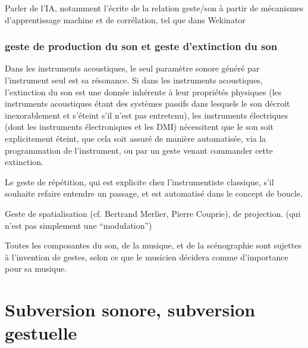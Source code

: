 
Parler de l'IA, notamment l'écrite de la relation geste/son à partir de mécanismes d'apprentissage machine et de corrélation, tel que dans Wekinator

\subsubsection{geste de production du son et geste d'extinction du son}

Dans les instruments acoustiques, le seul paramètre sonore généré par l'instrument seul est sa résonance.
Si dans les instruments acoustiques, l'extinction du son est une donnée inhérente à leur propriétés physiques (les instruments acoustiques étant des systèmes passifs dans lesquels le son décroit inexorablement et s'éteint s'il n'est pas entretenu), les instruments électriques (dont les instruments électroniques et les \gls{DMI}) nécessitent que le son soit explicitement éteint, que cela soit assuré de manière automatisée, via la programmation de l'instrument, ou par un geste venant commander cette extinction.

Le geste de répétition, qui est explicite chez l'instrumentiste classique, s'il souhaite refaire entendre un passage, et est automatisé dans le concept de boucle.

Geste de spatialisation (cf. Bertrand Merlier, Pierre Couprie), de projection. (qui n'est pas simplement une ``modulation'')

Toutes les composantes du son, de la musique, et de la scénographie sont sujettes à l'invention de gestes, selon ce que le musicien décidera comme d'importance pour sa musique.



\section{Subversion sonore, subversion gestuelle}

